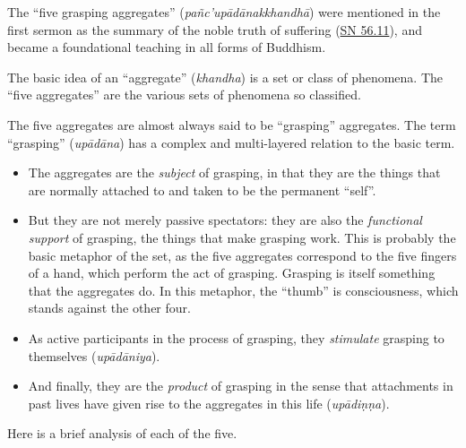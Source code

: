 \documentclass[12pt,openany]{book}%
\begin{document}
The “five grasping aggregates” (\textit{\textsanskrit{pañc}’\textsanskrit{upādānakkhandhā}}) were mentioned in the first sermon as the summary of the noble truth of suffering (\href{https://suttacentral.net/sn56.11}{SN 56.11}), and became a foundational teaching in all forms of Buddhism.

The basic idea of an “aggregate” (\textit{khandha}) is a set or class of phenomena. The “five aggregates” are the various sets of phenomena so classified.

The five aggregates are almost always said to be “grasping” aggregates. The term “grasping” (\textit{\textsanskrit{upādāna}}) has a complex and multi-layered relation to the basic term.

\begin{itemize}%
\item The aggregates are the \emph{subject} of grasping, in that they are the things that are normally attached to and taken to be the permanent “self”.%
\item But they are not merely passive spectators: they are also the \emph{functional support} of grasping, the things that make grasping work. This is probably the basic metaphor of the set, as the five aggregates correspond to the five fingers of a hand, which perform the act of grasping. Grasping is itself something that the aggregates do. In this metaphor, the “thumb” is consciousness, which stands against the other four.%
\item As active participants in the process of grasping, they \emph{stimulate} grasping to themselves (\textit{\textsanskrit{upādāniya}}).%
\item And finally, they are the \emph{product} of grasping in the sense that attachments in past lives have given rise to the aggregates in this life (\textit{\textsanskrit{upādiṇṇa}}).%
\end{itemize}

Here is a brief analysis of each of the five.
\end{document}
